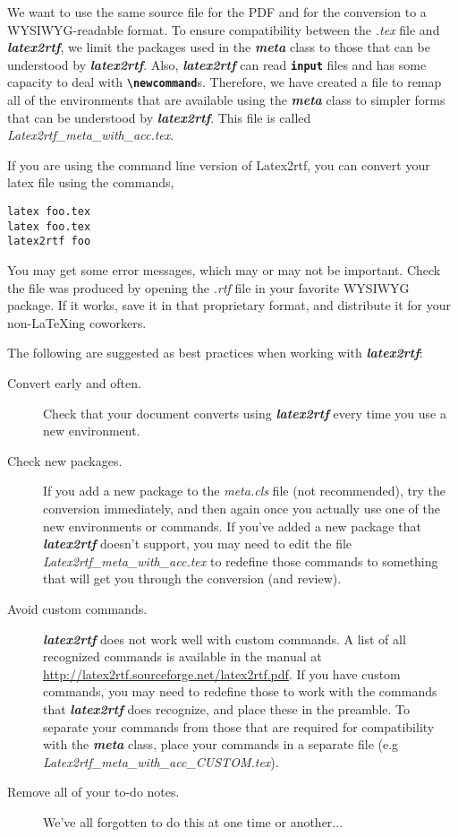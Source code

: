 \documentclass[12pt,letterpaper]{article}
\newcommand{\fn}[1]{\emph{#1}}
\newcommand{\packagename}[1]{\textbf{\emph{#1}}}
\newcommand{\envname}[1]{\textbf{\texttt{#1}}}
\begin{document}
We want to use the same source file for the PDF and for the conversion to a WYSIWYG-readable format. To ensure compatibility between the \fn{.tex} file and \packagename{latex2rtf}, we limit the packages used in the \packagename{meta} class to those that can be understood by \packagename{latex2rtf}. Also, \packagename{latex2rtf} can read \envname{input} files and has some capacity to deal with \envname{\textbackslash newcommand}s. Therefore, we have created a file to remap all of the environments that are available using the \packagename{meta} class to simpler forms that can be understood by \packagename{latex2rtf}. This file is called \fn{Latex2rtf\_meta\_with\_acc.tex}. 

If you are using the command line version of Latex2rtf, you can convert your latex file using the commands,

\begin{verbatim}
latex foo.tex
latex foo.tex
latex2rtf foo
\end{verbatim}

You may get some error messages, which may or may not be important. Check the file was produced by opening the \fn{.rtf} file in your favorite WYSIWYG package. If it works, save it in that proprietary format, and distribute it for your non-\LaTeX ing coworkers.

The following are suggested as best practices when working with \packagename{latex2rtf}:

\begin{description}
\item[Convert early and often.] Check that your document converts using \packagename{latex2rtf} every time you use  a new environment.
\item[Check new packages.]  If you add a new package to the \fn{meta.cls} file (not recommended), try the conversion immediately, and then again once you actually use one of the new environments or commands. If you've added a new package that \packagename{latex2rtf} doesn't support, you may need to edit the file \fn{Latex2rtf\_meta\_with\_acc.tex} to redefine those commands to something that will get you through the conversion (and review).
\item[Avoid custom commands.] \packagename{latex2rtf} does not work well with custom commands. A list of all recognized commands is available in the manual at \url{http://latex2rtf.sourceforge.net/latex2rtf.pdf}. If you have custom commands, you may need to redefine those to work with the commands that \packagename{latex2rtf} does recognize, and place these in the preamble. To separate your commands from those that are required for compatibility with the \packagename{meta} class, place your commands in a separate file (e.g \fn{Latex2rtf\_meta\_with\_acc\_CUSTOM.tex}).
\item[Remove all of your to-do notes.] We've all forgotten to do this at one time or another...
\end{description}
\end{document}
